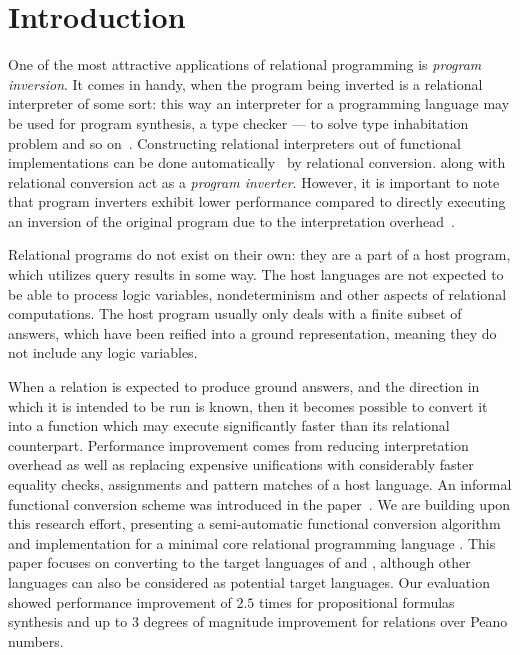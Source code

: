 \section{Introduction}
One of the most attractive applications of relational programming is \emph{program inversion}.
It comes in handy, when the program being inverted is a relational interpreter of some sort: this way an interpreter for a programming language may be used for program synthesis, a type checker --- to solve type inhabitation problem and so on~\cite{Untagged, lozov2019relational}.
Constructing relational interpreters out of functional implementations can be done automatically~\cite{lozov2018typed} by relational conversion.
\mk along with relational conversion act as a \emph{program inverter}.
However, it is important to note that program inverters exhibit lower performance compared to directly executing an inversion of the original program due to the interpretation overhead~\cite{RevURA,SemanticsModifiers1}.

Relational programs do not exist on their own: they are a part of a host program, which utilizes query results in some way.
The host languages are not expected to be able to process logic variables, nondeterminism and other aspects of relational computations.
The host program usually only deals with a finite subset of answers, which have been reified into a ground representation, meaning they do not include any logic variables.

When a relation is expected to produce ground answers, and the direction in which it is intended to be run is known, then it becomes possible to convert it into a function which may execute significantly faster than its relational counterpart.
Performance improvement comes from reducing interpretation overhead as well as replacing expensive unifications with considerably faster equality checks, assignments and pattern matches of a host language.
An informal functional conversion scheme was introduced in the paper~\cite{verbitskaia2022direction}.
We are building upon this research effort, presenting a semi-automatic functional conversion algorithm and implementation for a minimal core relational programming language \micro.
This paper focuses on converting to the target languages of \haskell and \ocaml, although other languages can also be considered as potential target languages.
Our evaluation showed performance improvement of $2.5$ times for propositional formulas synthesis and up to $3$ degrees of magnitude improvement for relations over Peano numbers. 